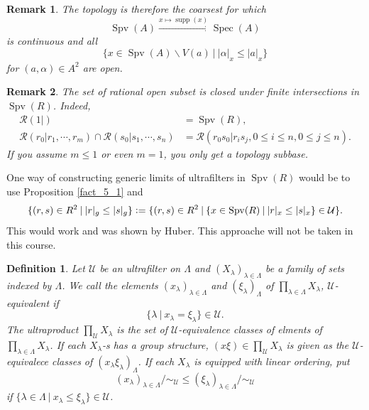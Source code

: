 \documentclass[8pt]{article}
\numberwithin{equation}{section}
\newtheorem{definition}{Definition}[subsection]
\newtheorem{remark}{Remark}[subsection]
\DeclareMathOperator{\supp}{supp}
\DeclareMathOperator{\Spec}{Spec}
\DeclareMathOperator{\Spv}{Spv}
\newcommand{\defeq}{\vcentcolon=}
\newcommand{\U}[0]{\mathcal{U}}
\newcommand{\sep}[0]{\:|\:}
\begin{document}
\begin{remark}
    The topology is therefore the coarsest for which
    \begin{equation*}
        \Spv(A)\stackrel{x\mapsto\supp(x)}{\to}\Spec(A)
    \end{equation*}
    is continuous and all
    \begin{equation*}
        \{x\in\Spv(A)\backslash V(a)\sep \vert\alpha\vert_x\leq\vert a\vert_x\}
    \end{equation*}
    for $(a,\alpha)\in A^2$ are open.
\end{remark}
\begin{remark}
    The set of rational open subset is closed under finite intersections in $\Spv(R)$. Indeed,
    \begin{align*}
        \mathcal{R}(1|) &= \Spv(R),\\
        \mathcal{R}(r_0|r_1,\cdots,r_m)\cap\mathcal{R}(s_0|s_1,\cdots,s_n) &= \mathcal{R}(r_0s_0|r_is_j,0\leq i\leq n,0\leq j\leq n).
    \end{align*}
    If you assume $m\leq 1$ or even $m=1$, you only get a topology subbase.
\end{remark}
One way of constructing generic limits of ultrafilters in $\Spv(R)$ would be to use Proposition \ref{fact_5_1} and 
\begin{equation*}
    \{(r,s)\in R^2\sep \vert r\vert_g\leq\vert s\vert_g\}\defeq \{(r,s)\in R^2\sep \{x\in\Spv(R)\sep \vert r\vert_x\leq \vert s\vert_x\}\in\U\}.
\end{equation*}
This would work and was shown by Huber. This approache will not be taken in this course.
\begin{definition}
    \label{definition_5_6}
    Let $\U$ be an ultrafilter on $\Lambda$ and $(X_\lambda)_{\lambda\in\Lambda}$ be a family of sets indexed by $\Lambda$. We call the elements $(x_\lambda)_{\lambda\in\Lambda}$ and $(\xi_\lambda)_{\Lambda}$ of $\prod_{\lambda\in\Lambda}X_\lambda$, $\U$-equivalent if 
    \begin{equation*}
        \{\lambda\sep x_\lambda=\xi_\lambda\}\in\U.
    \end{equation*}
    The ultraproduct $\prod_{\U}X_\lambda$ is the set of $\U$-equivalence classes of elments of $\prod_{\lambda\in\Lambda}X_\lambda$. If each $X_\lambda$-s has a group structure, $(x\xi)\in\prod_\U X_\lambda$ is given as the $\U$-equivalece classes of $(x_\lambda\xi_\lambda)_\Lambda$. If each $X_\lambda$ is equipped with linear ordering, put 
    \begin{equation*}
        (x_\lambda)_{\lambda\in\Lambda}/\sim_\U \leq (\xi_\lambda)_{\lambda\in\Lambda}/\sim_\U
    \end{equation*}
    if $\{\lambda\in\Lambda\sep x_\lambda\leq\xi_\lambda\}\in\U$.
\end{definition}
\end{document}
